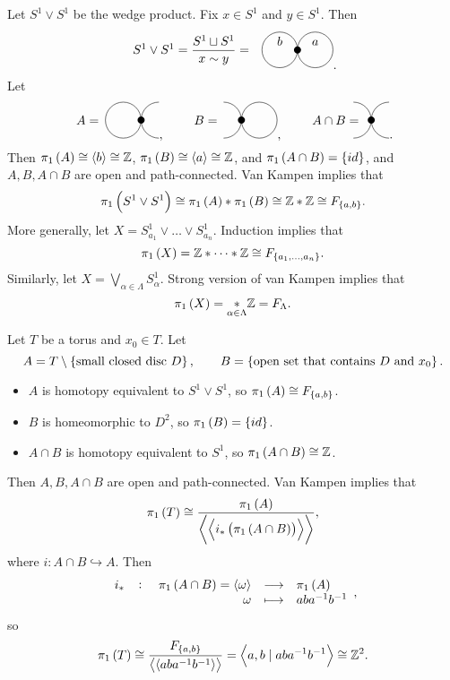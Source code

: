 \begin{example*}
Let $ S^1 \vee S^1 $ be the wedge product. Fix $ x \in S^1 $ and $ y \in S^1 $. Then
$$
\begin{tikzpicture}
\draw (-3, 0) node{$ S^1 \vee S^1 = \dfrac{S^1 \sqcup S^1}{x \sim y} = $};
\fill (0, 0) circle (0.1);
\draw (-0.5, 0) circle (0.5) node[above]{$ b $};
\draw (0.5, 0) circle (0.5) node[above]{$ a $};
\end{tikzpicture}.
$$
Let
$$
\begin{tikzpicture}
\draw (-1.5, 0) node{$ A = $};
\fill (0, 0) circle (0.1);
\draw (-0.5, 0) circle (0.5);
\draw (0.5, 0.5) arc (90:270:0.5);
\end{tikzpicture},
\qquad
\begin{tikzpicture}
\draw (-1, 0) node{$ B = $};
\fill (0, 0) circle (0.1);
\draw (-0.5, 0.5) arc (90:-90:0.5);
\draw (0.5, 0) circle (0.5);
\end{tikzpicture},
\qquad
\begin{tikzpicture}
\draw (-1, 0) node{$ A \cap B = $};
\fill (0, 0) circle (0.1);
\draw (-0.5, 0.5) arc (90:-90:0.5);
\draw (0.5, 0.5) arc (90:270:0.5);
\end{tikzpicture}.
$$
Then $ \pi_1\br{A} \cong \abr{b} \cong \Z $, $ \pi_1\br{B} \cong \abr{a} \cong \Z $, and $ \pi_1\br{A \cap B} = \cbr{id} $, and $ A, B, A \cap B $ are open and path-connected. Van Kampen implies that
$$ \pi_1\br{S^1 \vee S^1} \cong \pi_1\br{A} * \pi_1\br{B} \cong \Z * \Z \cong F_{\cbr{a, b}}. $$
More generally, let $ X = S_{a_1}^1 \vee \dots \vee S_{a_n}^1 $. Induction implies that
$$ \pi_1\br{X} = \Z * \dots * \Z \cong F_{\cbr{a_1, \dots, a_n}}. $$
Similarly, let $ X = \bigvee_{\alpha \in \Lambda} S_\alpha^1 $. Strong version of van Kampen implies that
$$ \pi_1\br{X} = \underset{\alpha \in \Lambda}{*} \Z = F_\Lambda. $$
\end{example*}

\begin{example*}
Let $ T $ be a torus and $ x_0 \in T $. Let
$$ A = T \setminus \cbr{\text{small closed disc} \ D}, \qquad B = \cbr{\text{open set that contains} \ D \ \text{and} \ x_0}. $$
\begin{itemize}
\item $ A $ is homotopy equivalent to $ S^1 \vee S^1 $, so $ \pi_1\br{A} \cong F_{\cbr{a, b}} $.
\item $ B $ is homeomorphic to $ D^2 $, so $ \pi_1\br{B} = \cbr{id} $.
\item $ A \cap B $ is homotopy equivalent to $ S^1 $, so $ \pi_1\br{A \cap B} \cong \Z $.
\end{itemize}
Then $ A, B, A \cap B $ are open and path-connected. Van Kampen implies that
$$ \pi_1\br{T} \cong \dfrac{\pi_1\br{A}}{\abr{\abr{i_*\br{\pi_1\br{A \cap B}}}}}, $$
where $ i : A \cap B \hookrightarrow A $. Then
$$ \function[i_*]{\pi_1\br{A \cap B} = \abr{\omega}}{\pi_1\br{A}}{\omega}{aba^{-1}b^{-1}}, $$
so
$$ \pi_1\br{T} \cong \dfrac{F_{\cbr{a, b}}}{\abr{\abr{aba^{-1}b^{-1}}}} = \abr{a, b \mid aba^{-1}b^{-1}} \cong \Z^2. $$
\end{example*}

